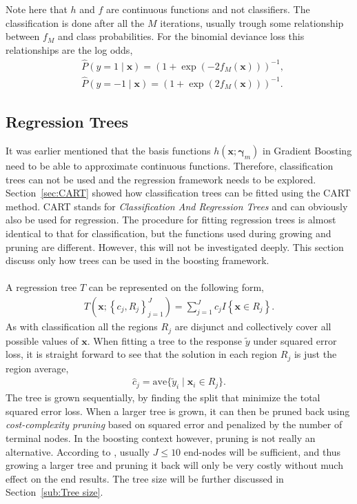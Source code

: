Note here that $h$ and $f$ are continuous functions and not classifiers. The classification is done after all the $M$ iterations, usually trough some relationship between $f_M$ and class probabilities. For the binomial deviance loss this relationships are the log odds,
\begin{align}
  \label{eq:boostLogOdds1} 
  &\hat P(y = 1 \mid  \mathbf{x}) = \left( 1+ \exp\left( -2 f_M (\mathbf{x}) \right) \right)^{-1},\\
  \label{eq:boostLogOdds2} 
  &\hat P(y = -1 \mid \mathbf{x}) = \left( 1+ \exp\left( 2 f_M (\mathbf{x}) \right) \right)^{-1}.
\end{align}
\subsection{Regression Trees}
\label{sub:Regression Trees}
It was earlier mentioned that the basis functions $h(\mathbf{x}; \bm{\gamma}_m)$ in Gradient Boosting need to be able to approximate continuous functions. Therefore, classification trees can not be used and the regression framework needs to be explored.
Section~\ref{sec:CART} showed how classification trees can be fitted using the CART method. CART stands for \textit{Classification And Regression Trees} and can obviously also be used for regression. The procedure for fitting regression trees is almost identical to that for classification, but the functions used during growing and pruning are different. However, this will not be investigated deeply. This section discuss only how trees can be used in the boosting framework.\\
\\
A regression tree $T$ can be represented on the following form,
\begin{align}
  T(\mathbf{x}; \left\{ c_j, R_j \right\}_{j = 1}^J)  = \sum^{J}_{j=1} c_j I\left\{ \mathbf{x} \in R_j \right\}.
\end{align}
As with classification all the regions $R_j$ are disjunct and collectively cover all possible values of $\mathbf{x}$. 
When fitting a tree to the response $\tilde y$ under squared error loss, it is straight forward to see that the solution in each region $R_j$ is just the region average,
\begin{align}
  \hat{c}_j = \mathrm{ave}\{\tilde y_i \mid \mathbf{x}_i \in R_j\}.
\end{align}
The tree is grown sequentially, by finding the split that minimize the total squared error loss. When a larger tree is grown, it can then be pruned back using \textit{cost-complexity pruning} based on squared error and penalized by the number of terminal nodes. In the boosting context however, pruning is not really an alternative. According to \cite{modstat}, usually $J \leq 10$ end-nodes will be sufficient, and thus growing a larger tree and pruning it back will only be very costly without much effect on the end results. The tree size will be further discussed in Section~\ref{sub:Tree size}.\\
